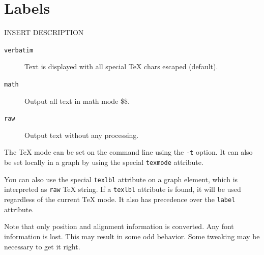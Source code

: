 \documentclass[10pt,a4paper,english]{article}
\newlength{\admonitionwidth}
\begin{document}

\hypertarget{labels}{}
\section*{Labels}
\label{labels}

INSERT DESCRIPTION
\begin{description}
\item[{\texttt{verbatim}}] \leavevmode 
Text is displayed with all special TeX chars escaped (default).

\item[{\texttt{math}}] \leavevmode 
Output all text in math mode {\$}{\$}.

\item[{\texttt{raw}}] \leavevmode 
Output text without any processing.

\end{description}

The TeX mode can be set on the command line using the \texttt{-t} option. It can also be set locally in a graph by using the special \texttt{texmode} attribute.

You can also use the special \texttt{texlbl} attribute on a graph element, which is interpreted as \texttt{raw} TeX string. If a \texttt{texlbl} attribute is found, it will be used regardless of the current TeX mode. It also has precedence over the \texttt{label} attribute.
\begin{center}\begin{sffamily}
\end{sffamily}
\end{center}

Note that only position and alignment information is converted. Any font information is lost. This may result in some odd behavior. Some tweaking may be necessary to get it right.
\begin{center}\begin{sffamily}
\end{sffamily}
\end{center}
\end{document}
